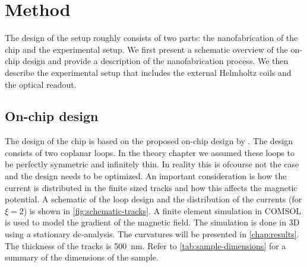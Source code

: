 \chapter{Method}
\label{chap:method}
The design of the setup roughly consists of two parts: the nanofabrication of the chip and the experimental setup. We first present a schematic overview of the on-chip design and provide a description of the nanofabrication process. We then describe the experimental setup that includes the external Helmholtz coils and the optical readout.

\section{On-chip design}
\label{sec:on-chip-design}
The design of the chip is based on the proposed on-chip design by \textcite{perdriat}. The design consists of two coplanar loops. In the theory chapter we assumed these loops to be perfectly symmetric and infinitely thin. In reality this is ofcourse not the case and the design needs to be optimized. An important consideration is how the current is distributed in the finite sized tracks and how this affects the magnetic potential. A schematic of the loop design and the distribution of the currents (for $\xi=2$) is shown in \autoref{fig:schematic-tracks}. A finite element simulation in COMSOL is used to model the gradient of the magnetic field. The simulation is done in 3D using a stationary dc-analysis. The curvatures will be presented in \autoref{chap:results}. The thickness of the tracks is \qty{500}{\nano\meter}. Refer to \autoref{tab:sample-dimensions} for a summary of the dimensions of the sample.


